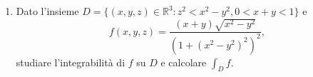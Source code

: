 \begin{enumerate}
	\textbf{Soluzione.}
		Dal teorema visto abbiamo
		\[
		\tilde{E}_\alpha = \left\{(x,t) \in \mathbb{R}^{n+1} : |x| \geq r, 0 \leq t \leq |x|^{-\alpha}\right\}
		\]
		pertanto la sua misura soddisfa le seguenti uguaglianze
		\[
		\begin{aligned}
			\mathbf{m}_{n+1}(\tilde{E}_\alpha) &= \int_{\mathbb{R}^n \setminus B(0,r)} \frac{1}{|x|^\alpha} dx \\
			&= \int_0^{r^{-\alpha}} \mathbf{m}_n \left(B\left(0, t^{-1/\alpha}\right) \setminus B(0,r)\right) dt \\
			&= \omega_n \int_0^{r^{-\alpha}} \left(t^{-n/\alpha} - r^n\right) dt \\
			&=
			\begin{cases}
				\frac{\alpha \omega_n}{\alpha - n} r^{n - \alpha} - \omega_n r^{n - \alpha} = \frac{n \omega_n}{\alpha - n} r^{n - \alpha} & \text{se } \alpha > n \\
				+\infty & \text{se } \alpha \leq n
			\end{cases}
		\end{aligned}
		\]

	
	\item Dato l'insieme $D = \{(x,y,z) \in \mathbb{R}^3 : z^2 < x^2 - y^2, 0 < x + y < 1\}$ e
	\[
	f(x,y,z) = \frac{(x + y)\sqrt{x^2 - y^2}}{(1 + (x^2 - y^2)^2)^2},
	\]
	studiare l'integrabilità di $f$ su $D$ e calcolare $\int_D f$.
	

\end{enumerate}
